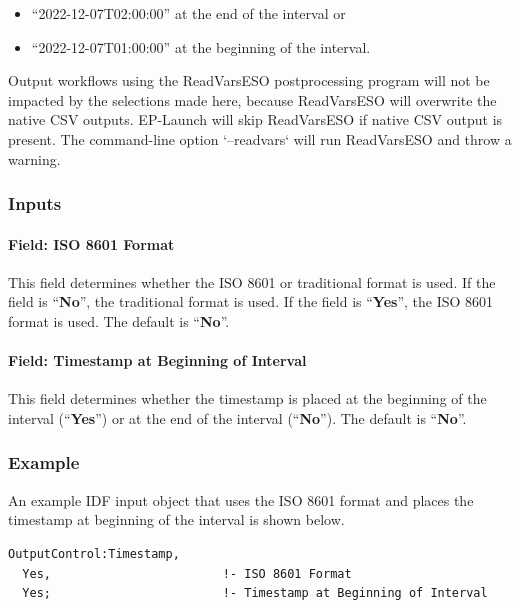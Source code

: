 \begin{itemize}
\item ``2022-12-07T02:00:00'' at the end of the interval or
\item ``2022-12-07T01:00:00'' at the beginning of the interval.
\end{itemize}
%
Output workflows using the ReadVarsESO postprocessing program will not be impacted by the selections made here, because ReadVarsESO will overwrite the native CSV outputs. EP-Launch will skip ReadVarsESO if native CSV output is present. The command-line option `--readvars` will run ReadVarsESO and throw a warning.

\subsubsection{Inputs}\label{inputs-for-timestamp}

\paragraph{Field: ISO 8601 Format}\label{field-timestamp-iso8601format}

This field determines whether the ISO 8601 or traditional format is used. If the field is ``\textbf{No}'', the traditional format is
used. If the field is ``\textbf{Yes}'', the ISO 8601 format is used. The default is ``\textbf{No}''.

\paragraph{Field: Timestamp at Beginning of Interval}\label{field-timestamp-beginning}

This field determines whether the timestamp is placed at the beginning of the interval (``\textbf{Yes}'') or at the end of the
interval (``\textbf{No}''). The default is ``\textbf{No}''.

\subsubsection{Example}\label{example-for-timestamp}

An example IDF input object that uses the ISO 8601 format and places the timestamp at beginning of the interval is shown below.
\begin{lstlisting}
OutputControl:Timestamp,
  Yes,                        !- ISO 8601 Format
  Yes;                        !- Timestamp at Beginning of Interval
\end{lstlisting}
